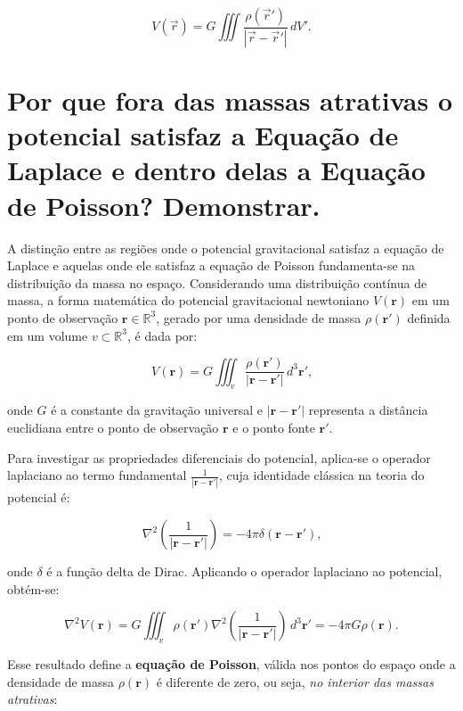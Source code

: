 \[
V(\vec{r}) = G \iiint \frac{\rho(\vec{r}')}{|\vec{r} - \vec{r}'|} \, dV' \text{.}
\]




\section{Por que fora das massas atrativas o potencial satisfaz a Equação de Laplace e dentro delas a Equação de Poisson? Demonstrar.}

A distinção entre as regiões onde o potencial gravitacional satisfaz a equação de Laplace e aquelas onde ele satisfaz a equação de Poisson fundamenta-se na distribuição da massa no espaço. Considerando uma distribuição contínua de massa, a forma matemática do potencial gravitacional newtoniano \( V(\mathbf{r}) \) em um ponto de observação \( \mathbf{r} \in \mathbb{R}^3 \), gerado por uma densidade de massa \( \rho(\mathbf{r}') \) definida em um volume \( v \subset \mathbb{R}^3 \), é dada por:

\[
V(\mathbf{r}) = G \iiint_{v} \frac{\rho(\mathbf{r}')}{|\mathbf{r} - \mathbf{r}'|} \, d^3\mathbf{r}' \text{,}
\]

\noindent onde \( G \) é a constante da gravitação universal e \( |\mathbf{r} - \mathbf{r}'| \) representa a distância euclidiana entre o ponto de observação \( \mathbf{r} \) e o ponto fonte \( \mathbf{r}' \).

Para investigar as propriedades diferenciais do potencial, aplica-se o operador laplaciano ao termo fundamental \( \frac{1}{|\mathbf{r} - \mathbf{r}'|} \), cuja identidade clássica na teoria do potencial é:

\[
\nabla^2 \left( \frac{1}{|\mathbf{r} - \mathbf{r}'|} \right) = -4\pi \delta(\mathbf{r} - \mathbf{r}') \text{,}
\]

\noindent onde \( \delta \) é a função delta de Dirac. Aplicando o operador laplaciano ao potencial, obtém-se:

\[
\nabla^2 V(\mathbf{r}) = G \iiint_{v} \rho(\mathbf{r}') \nabla^2 \left( \frac{1}{|\mathbf{r} - \mathbf{r}'|} \right) \, d^3\mathbf{r}' = -4\pi G \rho(\mathbf{r}) \text{.}
\]

Esse resultado define a \textbf{equação de Poisson}, válida nos pontos do espaço onde a densidade de massa \( \rho(\mathbf{r}) \) é diferente de zero, ou seja, \textit{no interior das massas atrativas}:

